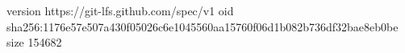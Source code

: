 version https://git-lfs.github.com/spec/v1
oid sha256:1176e57e507a430f05026c6e1045560aa15760f06d1b082b736df32bae8eb0be
size 154682
